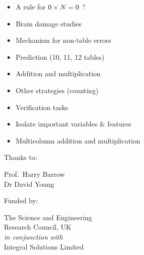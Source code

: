 
\begin{slide*}


\begin{itemize}
\item A rule for $\mbox{$0\times N$}=0$ ?
\item Brain damage studies
\item Mechanism for non-table errors
\item Prediction (10, 11, 12 tables)
\item Addition and multiplication
\item Other strategies (counting)
\item Verification tasks
\item Isolate important variables \& features
\item Multicolumn addition and multiplication
\end{itemize}

\end{slide*}



\begin{slide*}

\begin{flushleft}
\large

Thanks to:
\begin{center}
Prof.~Harry Barrow\\
Dr David Young
\end{center}

\vspace{1 true cm}

Funded by:

\begin{center}
The Science and Engineering\\ Research Council, UK\\
{\normalsize\em in conjunction with}\\
Integral Solutions Limited\\
\end{center}
\end{flushleft}
\end{slide*}


